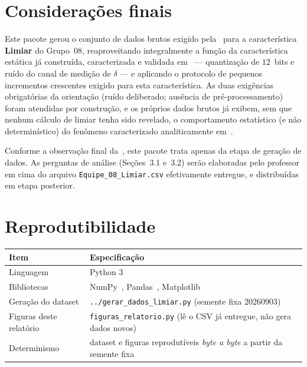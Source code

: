 \section{Considerações finais}

Este pacote gerou o conjunto de dados brutos exigido pela~\cite{orientacao2026} para a
característica \textbf{Limiar} do Grupo~08, reaproveitando integralmente a função da
característica estática já construída, caracterizada e validada em~\cite{limiarv1} ---
quantização de $12$~bits e ruído do canal de medição de $\delta$ --- e aplicando o protocolo de
pequenos incrementos crescentes exigido para esta característica. As duas exigências
obrigatórias da orientação (ruído deliberado; ausência de pré-processamento) foram atendidas por
construção, e os próprios dados brutos já exibem, sem que nenhum cálculo de limiar tenha sido
revelado, o comportamento estatístico (e não determinístico) do fenômeno caracterizado
analiticamente em~\cite{limiarv1}.

Conforme a observação final da~\cite{orientacao2026}, este pacote trata apenas da etapa de
geração de dados. As perguntas de análise (Seções~3.1 e~3.2) serão elaboradas pelo professor em
cima do arquivo \texttt{Equipe\_08\_Limiar.csv} efetivamente entregue, e distribuídas em etapa
posterior.

\appendix
\section{Reprodutibilidade}
\label{ap:repro}

\begin{center}\small
\begin{tabular}{@{}ll@{}}
\toprule
\textbf{Item} & \textbf{Especificação}\\
\midrule
Linguagem & Python 3\\
Bibliotecas & NumPy~\cite{numpy2020}, Pandas~\cite{mckinney2010}, Matplotlib~\cite{matplotlib2007}\\
Geração do dataset & \texttt{../gerar\_dados\_limiar.py} (semente fixa $20260903$)\\
Figuras deste relatório & \texttt{figuras\_relatorio.py} (lê o CSV já entregue, não gera dados novos)\\
Determinismo & dataset e figuras reprodutíveis \emph{byte a byte} a partir da semente fixa\\
\bottomrule
\end{tabular}
\end{center}

